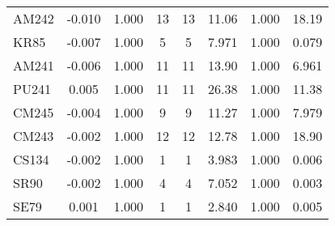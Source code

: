 \begin{tabular}{|l|ccccccc|}
AM242 & -0.010 & 1.000 & 13 & 13 & 11.06 & 1.000 & 18.19\\
KR85 & -0.007 & 1.000 & 5 & 5 & 7.971 & 1.000 & 0.079\\
AM241 & -0.006 & 1.000 & 11 & 11 & 13.90 & 1.000 & 6.961\\
PU241 & 0.005 & 1.000 & 11 & 11 & 26.38 & 1.000 & 11.38\\
CM245 & -0.004 & 1.000 & 9 & 9 & 11.27 & 1.000 & 7.979\\
CM243 & -0.002 & 1.000 & 12 & 12 & 12.78 & 1.000 & 18.90\\
CS134 & -0.002 & 1.000 & 1 & 1 & 3.983 & 1.000 & 0.006\\
SR90 & -0.002 & 1.000 & 4 & 4 & 7.052 & 1.000 & 0.003\\
SE79 & 0.001 & 1.000 & 1 & 1 & 2.840 & 1.000 & 0.005\\
\hline
\end{tabular}